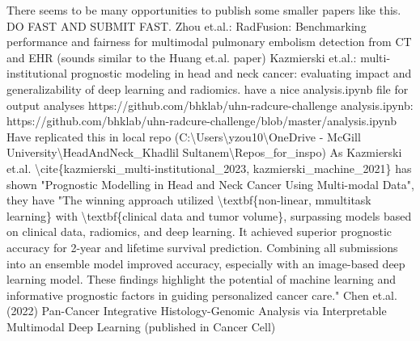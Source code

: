 \documentclass{article}%
\begin{document}
\newline%
\newline%
%
There seems to be many opportunities to publish some smaller papers like this. DO FAST AND SUBMIT FAST. %
\newline%
\newline%
%
Zhou et.al.: RadFusion: Benchmarking performance and fairness for multimodal pulmonary embolism detection from CT and EHR (sounds similar to the Huang et.al. paper) %
\newline%
\newline%
%
%
\newline%
\newline%
%
Kazmierski et.al.: multi{-}institutional prognostic modeling in head and neck cancer: evaluating impact and generalizability of deep learning and radiomics. have a nice analysis.ipynb file for output analyses %
\newline%
\newline%
%
https://github.com/bhklab/uhn{-}radcure{-}challenge %
\newline%
\newline%
%
analysis.ipynb: https://github.com/bhklab/uhn{-}radcure{-}challenge/blob/master/analysis.ipynb %
\newline%
\newline%
%
Have replicated this in local repo (C:\textbackslash{}Users\textbackslash{}yzou10\textbackslash{}OneDrive {-} McGill University\textbackslash{}HeadAndNeck\_Khadlil Sultanem\textbackslash{}Repos\_for\_inspo)   %
\newline%
\newline%
%
 As Kazmierski et.al. \textbackslash{}cite\{kazmierski\_multi{-}institutional\_2023, kazmierski\_machine\_2021\} has shown "Prognostic Modelling in Head and Neck Cancer Using Multi{-}modal Data", they have "The winning approach utilized \textbackslash{}textbf\{non{-}linear, mmultitask learning\} with \textbackslash{}textbf\{clinical data and tumor volume\}, surpassing models based on clinical data, radiomics, and deep learning. It achieved superior prognostic accuracy for 2{-}year and lifetime survival prediction. Combining all submissions into an ensemble model improved accuracy, especially with an image{-}based deep learning model. These findings highlight the potential of machine learning and informative prognostic factors in guiding personalized cancer care."%
\newline%
\newline%
%
Chen et.al. (2022) Pan{-}Cancer Integrative Histology{-}Genomic Analysis via Interpretable Multimodal Deep Learning (published in Cancer Cell) %
\end{document}
